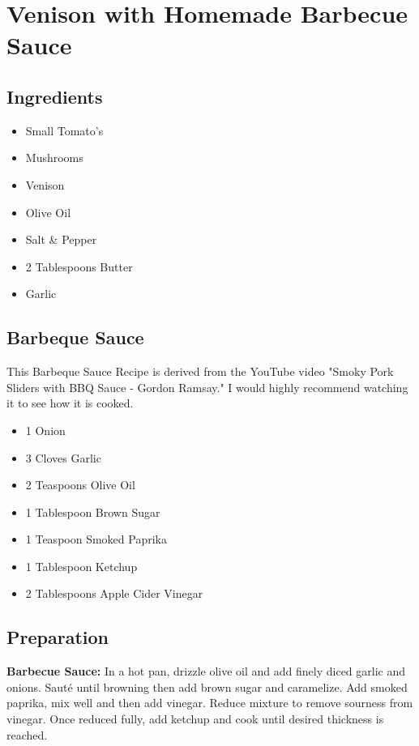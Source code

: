 \thispagestyle{fancy}
\section{Venison with Homemade Barbecue Sauce}
\AddToShipoutPicture*{\VenisonBBQ}

\subsection*{Ingredients}
\begin{multicols}{3}
	\begin{itemize}
		\item Small Tomato's
		\item Mushrooms
		\item Venison
		\item Olive Oil
		\item Salt \& Pepper
		\item 2 Tablespoons Butter
		\item Garlic
	\end{itemize}
\end{multicols}

\subsection*{Barbeque Sauce}
This Barbeque Sauce Recipe is derived from the YouTube video "Smoky Pork Sliders with BBQ Sauce - Gordon Ramsay." I would highly recommend watching it to see how it is cooked.
\begin{multicols}{3}
	\begin{itemize}
		\item 1 Onion
		\item 3 Cloves Garlic
		\item 2 Teaspoons Olive Oil
		\item 1 Tablespoon Brown Sugar
		\item 1 Teaspoon Smoked Paprika
		\item 1 Tablespoon Ketchup
		\item 2 Tablespoons Apple Cider Vinegar
	\end{itemize}
\end{multicols}

\subsection*{Preparation}
\textbf{Barbecue Sauce:} In a hot pan, drizzle olive oil and add finely diced garlic and onions. Saut\'{e} until browning then add brown sugar and caramelize. Add smoked paprika, mix well and then add vinegar. Reduce mixture to remove sourness from vinegar. Once reduced fully, add ketchup and cook until desired thickness is reached.

